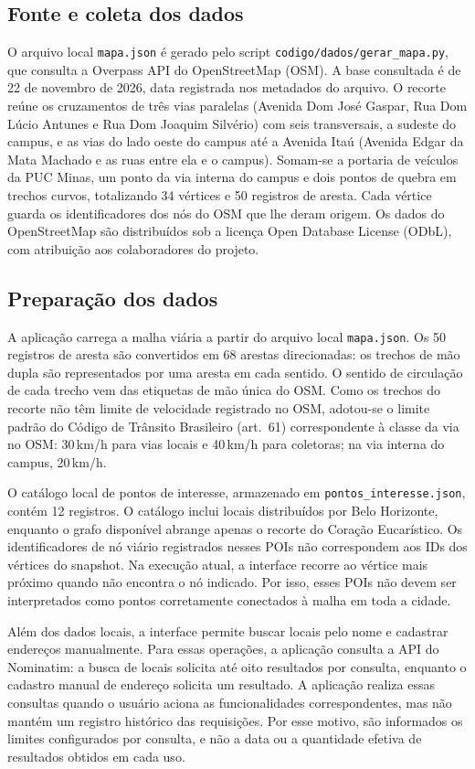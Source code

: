 \documentclass[12pt]{article}
\begin{document}
\subsection{Fonte e coleta dos dados}
O arquivo local \texttt{mapa.json} é gerado pelo script
\texttt{codigo/dados/gerar\_mapa.py}, que consulta a Overpass API do
OpenStreetMap (OSM). A base consultada é de 22 de novembro de 2026,
data registrada nos metadados do arquivo. O recorte reúne os
cruzamentos de três vias paralelas (Avenida Dom José Gaspar, Rua Dom
Lúcio Antunes e Rua Dom Joaquim Silvério) com seis transversais, a
sudeste do campus, e as vias do lado oeste do campus até a Avenida Itaú
(Avenida Edgar da Mata Machado e as ruas entre ela e o campus).
Somam-se a portaria de veículos da PUC Minas, um ponto da via interna
do campus e dois pontos de quebra em trechos curvos, totalizando
34 vértices e 50 registros de aresta. Cada vértice
guarda os identificadores dos nós do OSM que lhe deram origem. Os
dados do OpenStreetMap são distribuídos sob a licença Open Database
License (ODbL), com atribuição aos colaboradores do projeto.

\subsection{Preparação dos dados}
A aplicação carrega a malha viária a partir do arquivo local
\texttt{mapa.json}. Os 50 registros de aresta são convertidos em
68 arestas direcionadas: os trechos de mão dupla são representados por
uma aresta em cada sentido. O sentido de circulação de cada trecho vem
das etiquetas de mão única do OSM. Como os trechos do recorte não têm
limite de velocidade registrado no OSM, adotou-se o limite padrão do
Código de Trânsito Brasileiro (art.~61) correspondente à classe da via
no OSM: 30\,km/h para vias locais e 40\,km/h para coletoras; na via
interna do campus, 20\,km/h.

O catálogo local de pontos de interesse, armazenado em
\texttt{pontos\_interesse.json}, contém 12 registros. O catálogo inclui
locais distribuídos por Belo Horizonte, enquanto o grafo disponível
abrange apenas o recorte do Coração Eucarístico. Os identificadores de
nó viário registrados nesses POIs não correspondem aos IDs dos vértices
do snapshot. Na execução atual, a interface recorre ao vértice mais
próximo quando não encontra o nó indicado. Por isso, esses POIs não
devem ser interpretados como pontos corretamente conectados à malha em
toda a cidade.

Além dos dados locais, a interface permite buscar locais pelo nome e
cadastrar endereços manualmente. Para essas operações, a aplicação
consulta a API do Nominatim: a busca de locais solicita até oito
resultados por consulta, enquanto o cadastro manual de endereço solicita
um resultado. A aplicação realiza essas consultas quando o usuário
aciona as funcionalidades correspondentes, mas não mantém um registro
histórico das requisições. Por esse motivo, são informados os limites
configurados por consulta, e não a data ou a quantidade efetiva de
resultados obtidos em cada uso.
\end{document}
